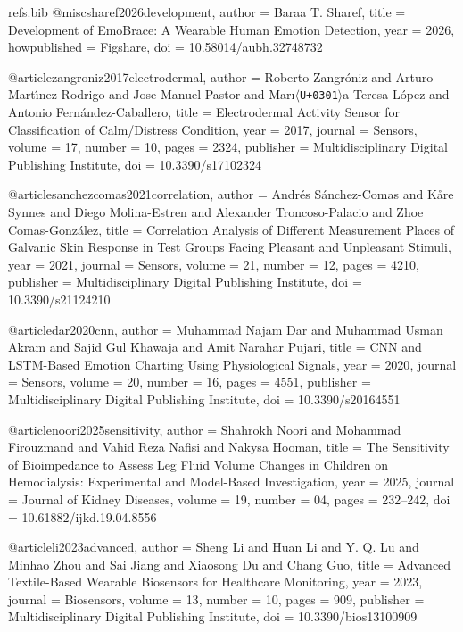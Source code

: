 \begin{filecontents*}[overwrite]{refs.bib}
@misc{sharef2026development,
  author = {Baraa T. Sharef},
  title = {{Development of EmoBrace: A Wearable Human Emotion Detection}},
  year = {2026},
  howpublished = {Figshare},
  doi = {10.58014/aubh.32748732}
}

@article{zangroniz2017electrodermal,
  author = {Roberto Zangr{\'o}niz and Arturo Mart{\'\i}nez{-}Rodrigo and Jose Manuel Pastor and Mar{\i}\ensuremath{\langle}\texttt{U+0301}\ensuremath{\rangle}a Teresa L{\'o}pez and Antonio Fern{\'a}ndez{-}Caballero},
  title = {{Electrodermal Activity Sensor for Classification of Calm/Distress Condition}},
  year = {2017},
  journal = {Sensors},
  volume = {17},
  number = {10},
  pages = {2324},
  publisher = {Multidisciplinary Digital Publishing Institute},
  doi = {10.3390/s17102324}
}

@article{sanchezcomas2021correlation,
  author = {Andr{\'e}s S{\'a}nchez-Comas and K{\r{a}}re Synnes and Diego Molina-Estren and Alexander Troncoso-Palacio and Zhoe Comas-Gonz{\'a}lez},
  title = {{Correlation Analysis of Different Measurement Places of Galvanic Skin Response in Test Groups Facing Pleasant and Unpleasant Stimuli}},
  year = {2021},
  journal = {Sensors},
  volume = {21},
  number = {12},
  pages = {4210},
  publisher = {Multidisciplinary Digital Publishing Institute},
  doi = {10.3390/s21124210}
}

@article{dar2020cnn,
  author = {Muhammad Najam Dar and Muhammad Usman Akram and Sajid Gul Khawaja and Amit Narahar Pujari},
  title = {{CNN and LSTM-Based Emotion Charting Using Physiological Signals}},
  year = {2020},
  journal = {Sensors},
  volume = {20},
  number = {16},
  pages = {4551},
  publisher = {Multidisciplinary Digital Publishing Institute},
  doi = {10.3390/s20164551}
}

@article{noori2025sensitivity,
  author = {Shahrokh Noori and Mohammad Firouzmand and Vahid Reza Nafisi and Nakysa Hooman},
  title = {{The Sensitivity of Bioimpedance to Assess Leg Fluid Volume Changes in Children on Hemodialysis: Experimental and Model-Based Investigation}},
  year = {2025},
  journal = {Journal of Kidney Diseases},
  volume = {19},
  number = {04},
  pages = {232--242},
  doi = {10.61882/ijkd.19.04.8556}
}

@article{li2023advanced,
  author = {Sheng Li and Huan Li and Y. Q. Lu and Minhao Zhou and Sai Jiang and Xiaosong Du and Chang Guo},
  title = {{Advanced Textile-Based Wearable Biosensors for Healthcare Monitoring}},
  year = {2023},
  journal = {Biosensors},
  volume = {13},
  number = {10},
  pages = {909},
  publisher = {Multidisciplinary Digital Publishing Institute},
  doi = {10.3390/bios13100909}
}


\end{filecontents*}
